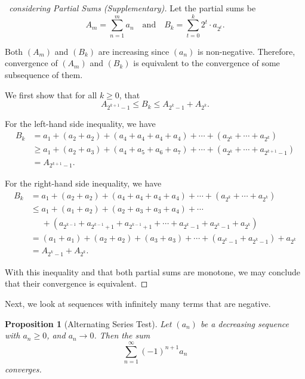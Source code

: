 \documentclass[11pt]{article}
\numberwithin{equation}{section}
\newtheorem{proposition}[theorem]{Proposition}
\theoremstyle{definition}
\theoremstyle{remark}
\newcommand{\pqty}[1]{\left(#1\right)}
\newcommand{\qand}{\quad\text{and}\quad}
\begin{document}
\begin{proof}[\proofname\ considering Partial Sums (Supplementary)]
    Let the partial sums be
        \[
            A_m = \sum_{n = 1}^{m} a_n \qand B_k = \sum_{t = 0}^{k} 2^t \cdot a_{2^t}.
        \]

        Both \(\pqty{A_m}\) and \(\pqty{B_k}\) are increasing since \(\pqty{a_n}\) is non-negative. Therefore, convergence of \(\pqty{A_m}\) and \(\pqty{B_k}\) is equivalent to the convergence of some subsequence of them.

        We first show that for all \(k \geq 0\), that
        \[
            A_{2^{k + 1} - 1} \leq B_{k} \leq A_{2^k - 1} + A_{2^k}.
        \]

        For the left-hand side inequality, we have
        \begin{align*}
            B_k &= a_1 + \pqty{a_2 + a_2} + \pqty{a_4 + a_4 + a_4 + a_4} + \cdots + \pqty{a_{2^k} + \cdots + a_{2^k}} \\
            &\geq a_1 + \pqty{a_2 + a_3} + \pqty{a_4 + a_5 + a_6 + a_7} + \cdots + \pqty{a_{2^k} + \cdots + a_{2^{k + 1} - 1}} \\
            &= A_{2^{k + 1} - 1}.
        \end{align*}

        For the right-hand side inequality, we have
        \begin{align*}
            B_k &= a_1 + \pqty{a_2 + a_2} + \pqty{a_4 + a_4 + a_4 + a_4} + \cdots + \pqty{a_{2^k} + \cdots + a_{2^k}} \\
            &\leq a_1 + \pqty{a_1 + a_2} + \pqty{a_2 + a_3 + a_3 + a_4} + \cdots \\
            &\phantom{=} + \pqty{a_{2^{k - 1}} + a_{2^{k - 1} + 1} + a_{2^{k - 1} + 1} + \cdots  + a_{2^k - 1} + a_{2^k - 1} + a_{2^k}} \\
            &= \pqty{a_1 + a_1} + \pqty{a_2 + a_2} + \pqty{a_3 + a_3} + \cdots + \pqty{a_{2^k - 1} + a_{2^k - 1}} + a_{2^k} \\
            &= A_{2^k - 1} + A_{2^k}.
        \end{align*}

        With this inequality and that both partial sums are monotone, we may conclude that their convergence is equivalent.
\end{proof}

Next, we look at sequences with infinitely many terms that are negative.

\begin{proposition}[Alternating Series Test]\label{analysis-unit-0052}
    \label{prop:ser-test-alternating}%
    Let \(\pqty{a_n}\) be a decreasing sequence with \(a_n \geq 0\), and \(a_n \to 0\). Then the sum
    \[
        \sum_{n = 1}^{\infty} \pqty{-1}^{n + 1} a_n
    \]  
    converges.
\end{proposition}
\end{document}
